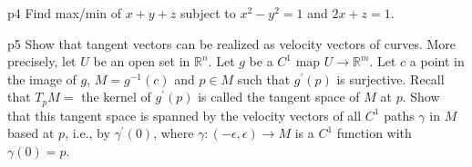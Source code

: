 \documentclass[a4paper, 11pt]{article}
\begin{document}

\begin{problem}{%
}{p4%
}
Find max/min of $x+y+z$ subject to $x^2-y^2=1$ and $2x+z=1.$
\end{problem}




\begin{problem}{%
}{p5%
}
Show that tangent vectors can be realized as velocity vectors of curves. More precisely, let $U$ be an open set in $\mathbb{R}^{n}$. Let $g$ be a $C^{1}$ map $U \rightarrow \mathbb{R}^{m}$. Let $c$ a point in the image of $g$, $M=g^{-1}(c)$ and $p \in M$ such that $g^{\prime}(p)$ is surjective. Recall that $T_{p} M=$ the kernel of $g^{\prime}(p)$ is called the tangent space of $M$ at $p$. Show that this tangent space is spanned by the velocity vectors of all $C^{1}$ paths $\gamma$ in $M$ based at $p$, i.e., by $\gamma^{\prime}(0)$, where $\gamma:(-\epsilon, \epsilon) \rightarrow M$ is a $C^{1}$ function with $\gamma(0)=p$.
\end{problem}
\end{document}
